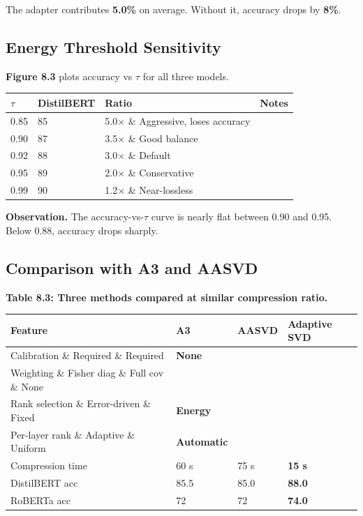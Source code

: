 The adapter contributes \textbf{5.0\%} on average. Without it, accuracy 
drops by \textbf{8\%}.

\subsection{Energy Threshold Sensitivity}

\textbf{Figure 8.3} plots accuracy vs $\tau$ for all three models.

\begin{table}[H]
\centering
\small
\begin{tabular}{llll}
\toprule
\textbf{$\tau$} & \textbf{DistilBERT} & \textbf{Ratio} & \textbf{Notes} \\
\midrule
0.85 & 85 & 5.0$\times$ \& Aggressive, loses accuracy \\
0.90 & 87 & 3.5$\times$ \& Good balance \\
0.92 & 88 & 3.0$\times$ \& Default \\
0.95 & 89 & 2.0$\times$ \& Conservative \\
0.99 & 90 & 1.2$\times$ \& Near-lossless \\
\bottomrule
\end{tabular}
\end{table}

\textbf{Observation.} The accuracy-vs-$\tau$ curve is nearly flat between 0.90 
and 0.95. Below 0.88, accuracy drops sharply.

\subsection{Comparison with A3 and AASVD}

\textbf{Table 8.3: Three methods compared at similar compression ratio.}

\begin{table}[H]
\centering
\small
\begin{tabular}{llll}
\toprule
\textbf{Feature} & \textbf{A3} & \textbf{AASVD} & \textbf{\textbf{Adaptive SVD}} \\
\midrule
Calibration \& Required \& Required & \textbf{None} \\
Weighting \& Fisher diag \& Full cov \& None \\
Rank selection \& Error-driven \& Fixed & \textbf{Energy} \\
Per-layer rank \& Adaptive \& Uniform & \textbf{Automatic} \\
Compression time & 60 s & 75 s & \textbf{15 s} \\
DistilBERT acc & 85.5 & 85.0 & \textbf{88.0} \\
RoBERTa acc & 72 & 72 & \textbf{74.0} \\
\bottomrule
\end{tabular}
\end{table}


